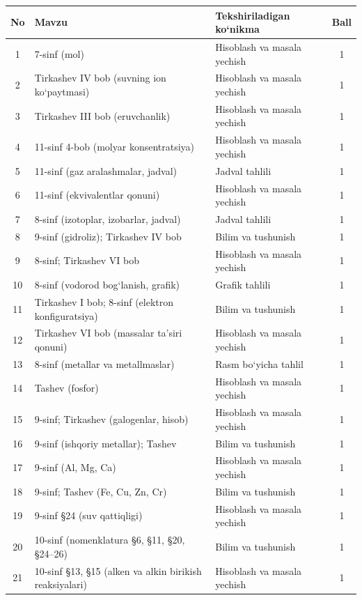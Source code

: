 \documentclass[11pt,a4paper]{article}
\begin{document}
{\small\noindent\begin{longtable}{|c|p{7.2cm}|p{5.4cm}|c|}\hline \textbf{No} & \textbf{Mavzu} & \textbf{Tekshiriladigan ko`nikma} & \textbf{Ball}\\\hline
1 & 7-sinf (mol) & Hisoblash va masala yechish & 1\\\hline
2 & Tirkashev IV bob (suvning ion ko`paytmasi) & Hisoblash va masala yechish & 1\\\hline
3 & Tirkashev III bob (eruvchanlik) & Hisoblash va masala yechish & 1\\\hline
4 & 11-sinf 4-bob (molyar konsentratsiya) & Hisoblash va masala yechish & 1\\\hline
5 & 11-sinf (gaz aralashmalar, jadval) & Jadval tahlili & 1\\\hline
6 & 11-sinf (ekvivalentlar qonuni) & Hisoblash va masala yechish & 1\\\hline
7 & 8-sinf (izotoplar, izobarlar, jadval) & Jadval tahlili & 1\\\hline
8 & 9-sinf (gidroliz); Tirkashev IV bob & Bilim va tushunish & 1\\\hline
9 & 8-sinf; Tirkashev VI bob & Hisoblash va masala yechish & 1\\\hline
10 & 8-sinf (vodorod bog`lanish, grafik) & Grafik tahlili & 1\\\hline
11 & Tirkashev I bob; 8-sinf (elektron konfiguratsiya) & Bilim va tushunish & 1\\\hline
12 & Tirkashev VI bob (massalar ta'siri qonuni) & Hisoblash va masala yechish & 1\\\hline
13 & 8-sinf (metallar va metallmaslar) & Rasm bo`yicha tahlil & 1\\\hline
14 & Tashev (fosfor) & Hisoblash va masala yechish & 1\\\hline
15 & 9-sinf; Tirkashev (galogenlar, hisob) & Hisoblash va masala yechish & 1\\\hline
16 & 9-sinf (ishqoriy metallar); Tashev & Bilim va tushunish & 1\\\hline
17 & 9-sinf (Al, Mg, Ca) & Hisoblash va masala yechish & 1\\\hline
18 & 9-sinf; Tashev (Fe, Cu, Zn, Cr) & Bilim va tushunish & 1\\\hline
19 & 9-sinf \S{}24 (suv qattiqligi) & Hisoblash va masala yechish & 1\\\hline
20 & 10-sinf (nomenklatura \S{}6, \S{}11, \S{}20, \S{}24--26) & Bilim va tushunish & 1\\\hline
21 & 10-sinf \S{}13, \S{}15 (alken va alkin birikish reaksiyalari) & Hisoblash va masala yechish & 1\\\hline

\end{longtable}}
\end{document}
